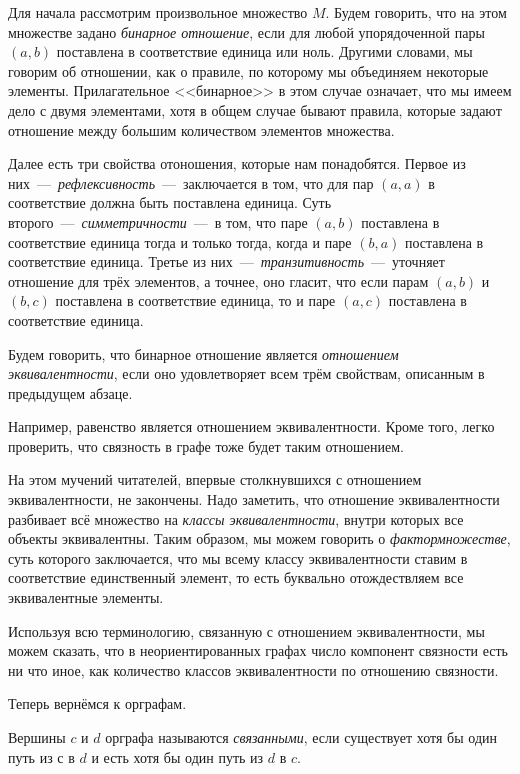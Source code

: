	
	Для начала рассмотрим произвольное множество $M$. Будем говорить, что на этом множестве задано \emph{бинарное отношение}, если для любой упорядоченной пары $(a, b)$ поставлена в соответствие единица или ноль. Другими словами, мы говорим об отношении, как о правиле, по которому мы объединяем некоторые элементы. Прилагательное <<бинарное>> в этом случае означает, что мы имеем дело с двумя элементами, хотя в общем случае бывают правила, которые задают отношение между большим количеством элементов множества.
	
	Далее есть три свойства отоношения, которые нам понадобятся. Первое из них~---~\emph{рефлексивность}~---~заключается в том, что для пар $(a, a)$ в соответствие должна быть поставлена единица. Суть второго~---~\emph{симметричности}~---~в том, что паре $(a, b)$ поставлена в соответствие единица тогда и только тогда, когда и паре $(b, a)$ поставлена в соответствие единица. Третье из них~---~\emph{транзитивность}~---~уточняет отношение для трёх элементов, а точнее, оно гласит, что если парам $(a, b)$ и $(b, c)$ поставлена в соответствие единица, то и паре $(a, c)$ поставлена в соответствие единица.
	
	Будем говорить, что бинарное отношение является \emph{отношением эквивалентности}, если оно удовлетворяет всем трём свойствам, описанным в предыдущем абзаце.
	
	Например, равенство является отношением эквивалентности. Кроме того, легко проверить, что связность в графе тоже будет таким отношением. 
	
	На этом мучений читателей, впервые столкнувшихся с отношением эквивалентности, не закончены. Надо заметить, что отношение эквивалентности разбивает всё множество на \emph{классы эквивалентности}, внутри которых все объекты эквивалентны. Таким образом, мы можем говорить о \emph{фактормножестве}, суть которого заключается, что мы всему классу эквивалентности ставим в соответствие единственный элемент, то есть буквально отождествляем все эквивалентные элементы.
	
	Используя всю терминологию, связанную с отношением эквивалентности, мы можем сказать, что в неориентированных графах число компонент связности есть ни что иное, как количество классов эквивалентности по отношению связности.

	Теперь вернёмся к орграфам. 	
	

\begin{definition}
	Вершины $c$ и $d$ орграфа называются \emph{связанными}, если существует хотя бы один путь из $с$ в $d$ и есть хотя бы один путь из $d$ в $c$.
\end{definition}	 

